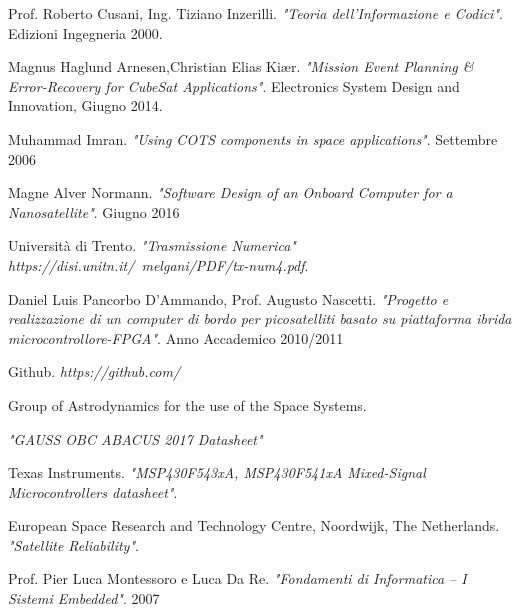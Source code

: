 \documentclass[LaM,binding=0.6cm]{../sapthesis}
\begin{document}
\begin{thebibliography}{9}
Prof. Roberto Cusani, Ing. Tiziano Inzerilli. 
\textit{"Teoria dell'Informazione e Codici"}. 
Edizioni Ingegneria 2000.

Magnus Haglund Arnesen,Christian Elias Kiær. 
\textit{"Mission Event Planning \& Error-Recovery for CubeSat Applications"}. 
Electronics System Design and Innovation, Giugno 2014.

Muhammad Imran.
\textit{"Using COTS components in space applications"}.
Settembre 2006

Magne Alver Normann.
\textit{"Software Design of an Onboard Computer
for a Nanosatellite"}. 
Giugno 2016

Università di Trento.
\textit{"Trasmissione Numerica" https://disi.unitn.it/~melgani/PDF/tx-num4.pdf}. 

Daniel Luis Pancorbo D'Ammando, Prof. Augusto Nascetti. 
\textit{"Progetto e realizzazione di un computer di bordo per picosatelliti basato su piattaforma ibrida microcontrollore-FPGA"}.
Anno Accademico 2010/2011

Github. 
\textit{https://github.com/}


Group of Astrodynamics for the use of the Space Systems.

\textit{"GAUSS OBC ABACUS 2017 Datasheet"}

Texas Instruments. 
\textit{"MSP430F543xA, MSP430F541xA Mixed-Signal Microcontrollers datasheet"}.

European Space Research and Technology Centre, Noordwijk, The Netherlands.
\textit{"Satellite Reliability"}.

Prof. Pier Luca Montessoro e Luca Da Re.
\textit{"Fondamenti di Informatica – I Sistemi Embedded"}.
2007

\end{thebibliography}

\clearpage
\end{document}
